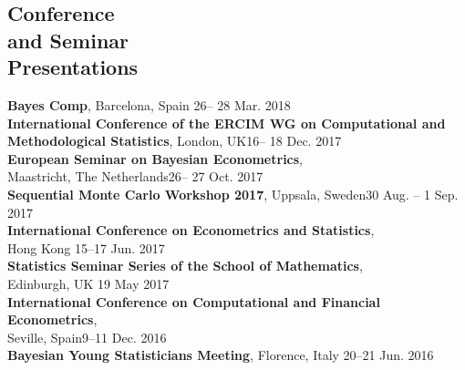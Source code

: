 \documentclass[margin,line]{resume}
\begin{document}
\begin{resume}
\section{\mysidestyle Conference \\and Seminar \\Presentations} 
	\textbf{ Bayes Comp}, Barcelona, Spain \hfill 26-- 28 Mar. 2018 \vspace{1mm} \\
	\textbf{ International Conference of the ERCIM WG on Computational and}\\
	\textbf{Methodological Statistics}, London, UK\hfill 16-- 18 Dec. 2017 \vspace{1mm} \\ 	
	\textbf{ European Seminar on Bayesian Econometrics},\\
	 Maastricht, The Netherlands\hfill 26-- 27 Oct. 2017 \vspace{1mm} \\ 
	\textbf{Sequential Monte Carlo Workshop 2017}, Uppsala, Sweden\hfill 30 Aug. -- 1 Sep. 2017 \vspace{1mm} \\ 
	\textbf{ International Conference on Econometrics and Statistics},\\ Hong Kong \hfill 15--17 Jun. 2017 \vspace{1mm} \\ 
    \textbf{Statistics Seminar Series of the School of Mathematics},\\ Edinburgh, UK \hfill 19 May 2017 \vspace{1mm} \\ 
    \textbf{ International Conference on Computational and Financial Econometrics},\\ Seville, Spain\hfill 9--11 Dec. 2016\\ 
	\textbf{ Bayesian Young Statisticians Meeting}, Florence, Italy \hfill 20--21 Jun. 2016\\ 

\end{resume}
\end{document}
